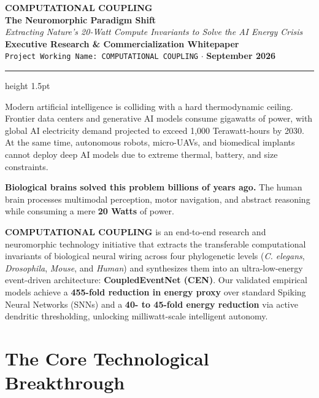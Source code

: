 \documentclass[11pt,letterpaper]{article}
\begin{document}
\begin{center}
    {\LARGE \textbf{\color{deepblue}COMPUTATIONAL COUPLING}}\\[4pt]
    {\Large \textbf{\color{brandblue}The Neuromorphic Paradigm Shift}}\\[6pt]
    {\large \textit{Extracting Nature's 20-Watt Compute Invariants to Solve the AI Energy Crisis}}\\[10pt]
    \textbf{Executive Research \& Commercialization Whitepaper}\\[2pt]
    \texttt{Project Working Name: COMPUTATIONAL COUPLING} $\cdot$ \textbf{September 2026}
\end{center}

\vspace{6pt}
\hrule height 1.5pt
\vspace{12pt}

\begin{tcolorbox}[colback=blue!5!white, colframe=brandblue, title=\textbf{Executive Summary \& The \$500 Billion AI Crisis}]
Modern artificial intelligence is colliding with a hard thermodynamic ceiling. Frontier data centers and generative AI models consume gigawatts of power, with global AI electricity demand projected to exceed 1,000 Terawatt-hours by 2030. At the same time, autonomous robots, micro-UAVs, and biomedical implants cannot deploy deep AI models due to extreme thermal, battery, and size constraints.

\textbf{Biological brains solved this problem billions of years ago.} The human brain processes multimodal perception, motor navigation, and abstract reasoning while consuming a mere \textbf{20 Watts} of power. 

\textbf{COMPUTATIONAL COUPLING} is an end-to-end research and neuromorphic technology initiative that extracts the transferable computational invariants of biological neural wiring across four phylogenetic levels (\textit{C. elegans}, \textit{Drosophila}, \textit{Mouse}, and \textit{Human}) and synthesizes them into an ultra-low-energy event-driven architecture: \textbf{CoupledEventNet (CEN)}. Our validated empirical models achieve a \textbf{455-fold reduction in energy proxy} over standard Spiking Neural Networks (SNNs) and a \textbf{40- to 45-fold energy reduction} via active dendritic thresholding, unlocking milliwatt-scale intelligent autonomy.
\end{tcolorbox}

\section{The Core Technological Breakthrough}
\end{document}
